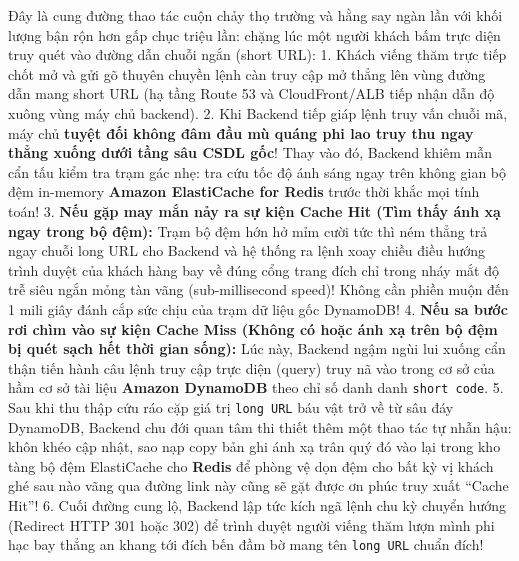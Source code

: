 Đây là cung đường thao tác cuộn chảy thọ trường và hằng say ngàn lần với
khối lượng bận rộn hơn gấp chục triệu lần: chặng lúc một người khách bấm
trực diện truy quét vào đường dẫn chuỗi ngắn (short URL): 1. Khách viếng
thăm trực tiếp chốt mở và gửi gõ thuyên chuyền lệnh càn truy cập mở
thẳng lên vùng đường dẫn mang short URL (hạ tầng Route 53 và
CloudFront/ALB tiếp nhận dẫn độ xuông vùng máy chủ backend). 2. Khi
Backend tiếp giáp lệnh truy vấn chuỗi mã, máy chủ \textbf{tuyệt đối
không đâm đầu mù quáng phi lao truy thu ngay thẳng xuống dưới tầng sâu
CSDL gốc}! Thay vào đó, Backend khiêm mẫn cẩn tấu kiểm tra trạm gác nhẹ:
tra cứu tốc độ ánh sáng ngay trên không gian bộ đệm in-memory
\textbf{Amazon ElastiCache for Redis} trước thời khắc mọi tính toán! 3.
\textbf{Nếu gặp may mắn nảy ra sự kiện Cache Hit (Tìm thấy ánh xạ ngay
trong bộ đệm):} Trạm bộ đệm hớn hở mỉm cười tức thì ném thẳng trả ngay
chuỗi long URL cho Backend và hệ thống ra lệnh xoay chiều điều hướng
trình duyệt của khách hàng bay về đúng cổng trang đích chỉ trong nháy
mắt độ trễ siêu ngắn mỏng tàn vãng (sub-millisecond speed)! Không cần
phiền muộn đến 1 mili giây đánh cắp sức chịu của trạm dữ liệu gốc
DynamoDB! 4. \textbf{Nếu sa bước rơi chìm vào sự kiện Cache Miss (Không
có hoặc ánh xạ trên bộ đệm bị quét sạch hết thời gian sống):} Lúc này,
Backend ngậm ngùi lui xuống cẩn thận tiến hành câu lệnh truy cập trực
diện (query) truy nã vào trong cơ sở của hầm cơ sở tài liệu
\textbf{Amazon DynamoDB} theo chỉ số danh danh \texttt{short\ code}. 5.
Sau khi thu thập cứu ráo cặp giá trị \texttt{long\ URL} báu vật trở về
từ sâu đáy DynamoDB, Backend chu đới quan tâm thi thiết thêm một thao
tác tự nhẫn hậu: khôn khéo cập nhật, sao nạp copy bản ghi ánh xạ trân
quý đó vào lại trong kho tàng bộ đệm ElastiCache cho \textbf{Redis} để
phòng vệ dọn đệm cho bất kỳ vị khách ghé sau nào vãng qua đường link này
cũng sẽ gặt được ơn phúc truy xuất ``Cache Hit''! 6. Cuối đường cung lộ,
Backend lập tức kích ngã lệnh chu kỳ chuyển hướng (Redirect HTTP 301
hoặc 302) để trình duyệt người viếng thăm lượn mình phi hạc bay thẳng an
khang tới đích bến đầm bờ mang tên \texttt{long\ URL} chuẩn đích!

